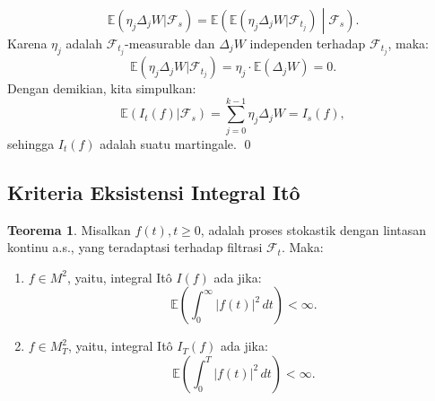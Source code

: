 \documentclass[aspectratio=169,11pt]{beamer}
\theoremstyle{definition}
\newtheorem{teorema}{Teorema}
\begin{document}
\begin{frame}[allowframebreaks]{\insertsection}{\insertsubsection}
\begin{equation*}
    \mathbb{E}(\eta_j \Delta_j W | \mathcal{F}_s) = \mathbb{E}\left( \mathbb{E}(\eta_j \Delta_j W | \mathcal{F}_{t_j}) \middle| \mathcal{F}_s \right).
  \end{equation*}
  Karena $\eta_j$ adalah $\mathcal{F}_{t_j}$-measurable dan $\Delta_j W$ independen terhadap $\mathcal{F}_{t_j}$, maka:
  \begin{equation*}
    \mathbb{E}(\eta_j \Delta_j W | \mathcal{F}_{t_j}) = \eta_j \cdot \mathbb{E}(\Delta_j W) = 0.
  \end{equation*}
  Dengan demikian, kita simpulkan:
  \begin{equation*}
    \mathbb{E}(I_t(f) | \mathcal{F}_s) = \sum_{j=0}^{k-1} \eta_j \Delta_j W = I_s(f),
  \end{equation*}
  sehingga $I_t(f)$ adalah suatu martingale. \qed
\end{frame}

\subsection{Kriteria Eksistensi Integral Itô}
\begin{frame}{\insertsection}{\insertsubsection}
  \begin{teorema}\label{thm:5.1}
    Misalkan $f(t), t \geq 0$, adalah proses stokastik dengan lintasan kontinu a.s., yang teradaptasi terhadap filtrasi $\mathcal{F}_t$. Maka:
    \begin{enumerate}
      \item $f \in M^2$, yaitu, integral Itô $I(f)$ ada jika:
            \begin{equation*}
              \mathbb{E}\left(\int_0^\infty |f(t)|^2 \, dt\right) < \infty.
            \end{equation*}
      \item $f \in M_T^2$, yaitu, integral Itô $I_T(f)$ ada jika:
            \begin{equation*}
              \mathbb{E}\left(\int_0^T |f(t)|^2 \, dt\right) < \infty.
            \end{equation*}
    \end{enumerate}
  \end{teorema}
\end{frame}
\end{document}
